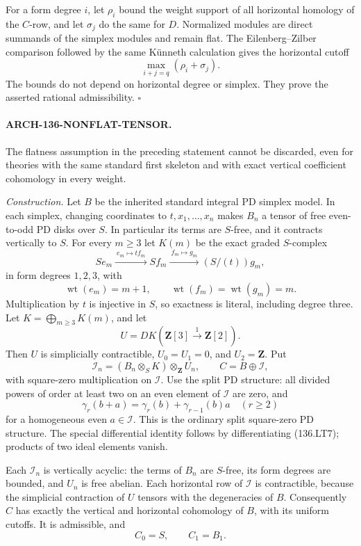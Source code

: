For a form degree \(i\), let \(\rho_i\) bound the weight support
of all horizontal homology of the \(C\)-row, and let \(\sigma_j\)
do the same for \(D\). Normalized modules are direct summands
of the simplex modules and remain flat. The
Eilenberg--Zilber comparison followed by the same K\"unneth
calculation gives the horizontal cutoff
\[
                  \max_{i+j=q}(\rho_i+\sigma_j).
 \tag{136.LT4}
\]
The bounds do not depend on horizontal degree or simplex.
They prove the asserted rational admissibility.
\hfill\(\square\)

\paragraph{ARCH-136-NONFLAT-TENSOR.}
The flatness assumption in the preceding statement cannot be
discarded, even for theories with the same standard first
skeleton and with exact vertical coefficient cohomology in
every weight.

\emph{Construction.}
Let \(B\) be the inherited standard integral PD simplex model.
In each simplex, changing coordinates to
\(t,x_1,\ldots,x_n\) makes \(B_n\) a tensor of free even-to-odd
PD disks over \(S\). In particular its terms are \(S\)-free,
and it contracts vertically to \(S\).
For every \(m\geq3\) let \(K(m)\) be the exact graded
\(S\)-complex
\[
 S e_m\xrightarrow{\ e_m\mapsto t f_m\ }
 S f_m\xrightarrow{\ f_m\mapsto g_m\ }
 (S/(t))g_m,
 \tag{136.LT5}
\]
in form degrees \(1,2,3\), with
\[
 \operatorname{wt}(e_m)=m+1,\qquad
 \operatorname{wt}(f_m)=\operatorname{wt}(g_m)=m.
 \]
Multiplication by \(t\) is injective in \(S\), so exactness is
literal, including degree three.
Let \(K=\bigoplus_{m\geq3}K(m)\), and let
\[
 U=DK(\mathbf Z[3]\xrightarrow{\,1\,}\mathbf Z[2]).
 \]
Then \(U\) is simplicially contractible,
\(U_0=U_1=0\), and \(U_2=\mathbf Z\). Put
\[
 \mathcal I_n=(B_n\otimes_S K)\otimes_{\mathbf Z}U_n,
                 \qquad C=B\oplus\mathcal I,
 \tag{136.LT6}
\]
with square-zero multiplication on \(\mathcal I\).
Use the split PD structure: all divided powers of order at
least two on an even element of \(\mathcal I\) are zero, and
\[
 \gamma_r(b+a)=\gamma_r(b)+\gamma_{r-1}(b)a
 \quad(r\geq2)
 \tag{136.LT7}
\]
for a homogeneous even \(a\in\mathcal I\).
This is the ordinary split square-zero PD structure. The
special differential identity follows by differentiating
(136.LT7); products of two ideal elements vanish.

Each \(\mathcal I_n\) is vertically acyclic: the terms of \(B_n\)
are \(S\)-free, its form degrees are bounded, and \(U_n\) is
free abelian. Each horizontal row of \(\mathcal I\) is
contractible, because the simplicial contraction of \(U\)
tensors with the degeneracies of \(B\). Consequently \(C\)
has exactly the vertical and horizontal cohomology of \(B\),
with its uniform cutoffs. It is admissible, and
\[
                         C_0=S,\qquad C_1=B_1.
 \]

